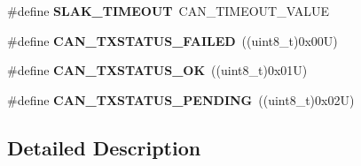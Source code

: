 \begin{DoxyCompactItemize}
\item 
\hypertarget{group___h_a_l___c_a_n___aliased___defines_ga1bb8107706c8b4039ac55a122f3c65bb}{\#define {\bfseries S\-L\-A\-K\-\_\-\-T\-I\-M\-E\-O\-U\-T}~C\-A\-N\-\_\-\-T\-I\-M\-E\-O\-U\-T\-\_\-\-V\-A\-L\-U\-E}\label{group___h_a_l___c_a_n___aliased___defines_ga1bb8107706c8b4039ac55a122f3c65bb}

\item 
\hypertarget{group___h_a_l___c_a_n___aliased___defines_gad6f04a4437ad8e83b154523f20985796}{\#define {\bfseries C\-A\-N\-\_\-\-T\-X\-S\-T\-A\-T\-U\-S\-\_\-\-F\-A\-I\-L\-E\-D}~((uint8\-\_\-t)0x00\-U)}\label{group___h_a_l___c_a_n___aliased___defines_gad6f04a4437ad8e83b154523f20985796}

\item 
\hypertarget{group___h_a_l___c_a_n___aliased___defines_ga01cd38ecda448043ba6a7870ab62fc2b}{\#define {\bfseries C\-A\-N\-\_\-\-T\-X\-S\-T\-A\-T\-U\-S\-\_\-\-O\-K}~((uint8\-\_\-t)0x01\-U)}\label{group___h_a_l___c_a_n___aliased___defines_ga01cd38ecda448043ba6a7870ab62fc2b}

\item 
\hypertarget{group___h_a_l___c_a_n___aliased___defines_gaf63b6b17ef36507122e0eaac8395aa1c}{\#define {\bfseries C\-A\-N\-\_\-\-T\-X\-S\-T\-A\-T\-U\-S\-\_\-\-P\-E\-N\-D\-I\-N\-G}~((uint8\-\_\-t)0x02\-U)}\label{group___h_a_l___c_a_n___aliased___defines_gaf63b6b17ef36507122e0eaac8395aa1c}

\end{DoxyCompactItemize}


\subsection{Detailed Description}
